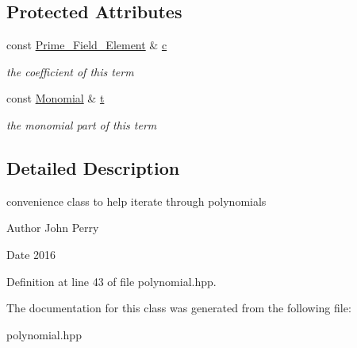 \subsection*{Protected Attributes}
\begin{DoxyCompactItemize}
\item 
\mbox{\label{class_polynomial___term_aacc7304520c8664217e7ce403a82d280}} 
const \hyperlink{class_prime___field___element}{Prime\+\_\+\+Field\+\_\+\+Element} \& \hyperlink{class_polynomial___term_aacc7304520c8664217e7ce403a82d280}{c}
\begin{DoxyCompactList}\small\item\em the coefficient of this term \end{DoxyCompactList}\item 
\mbox{\label{class_polynomial___term_a39c6314ec57dce98f2208d02d78e3402}} 
const \hyperlink{class_monomial}{Monomial} \& \hyperlink{class_polynomial___term_a39c6314ec57dce98f2208d02d78e3402}{t}
\begin{DoxyCompactList}\small\item\em the monomial part of this term \end{DoxyCompactList}\end{DoxyCompactItemize}


\subsection{Detailed Description}
convenience class to help iterate through polynomials 

\begin{DoxyAuthor}{Author}
John Perry 
\end{DoxyAuthor}
\begin{DoxyDate}{Date}
2016 
\end{DoxyDate}


Definition at line 43 of file polynomial.\+hpp.



The documentation for this class was generated from the following file\+:\begin{DoxyCompactItemize}
\item 
polynomial.\+hpp\end{DoxyCompactItemize}
